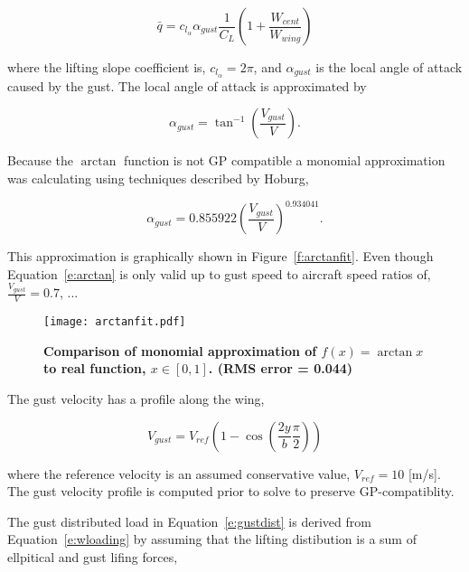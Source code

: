 \documentclass[]{aiaa-tc}%
\begin{document}
\begin{equation}
    \label{e:gustdist}
    \bar{q} = c_{l_{\alpha}} \alpha_{gust} \frac{1}{C_L} \left( 1 + \frac{W_{cent}}{W_{wing}} \right)
\end{equation}

where the lifting slope coefficient is, $c_{l_{\alpha}}=2\pi$, and $\alpha_{gust}$ is the local angle of attack caused by the gust. The local angle of attack is approximated by 

\begin{equation}
    \label{e:gustalpha}
    \alpha_{gust} = \tan^{-1}\left(\frac{V_{gust}}{V} \right).
\end{equation}

Because the $\arctan$ function is not GP compatible a monomial approximation was calculating using techniques described by Hoburg\cite{fitting},

\begin{equation}
    \label{e:arctan}
    \alpha_{gust} = 0.855922 \left(\frac{V_{gust}}{V} \right)^{0.934041}.
\end{equation}

This approximation is graphically shown in Figure~\ref{f:arctanfit}.  Even though Equation~\ref{e:arctan} is only valid up to gust speed to aircraft speed ratios of, $\frac{V_{gust}}{V} = 0.7$, ...

\begin{figure}[H]
	\begin{center}
	\texttt{[image: arctanfit.pdf]}
    \caption{ \textbf{ Comparison of monomial approximation of $f(x) = \arctan{x}$ to real function, $x \in [0,1]$. (RMS error = 0.044) }}
	\label{f:gustvschord}
	\end{center}
\end{figure}

The gust velocity has a profile along the wing\cite{acgust},

\begin{equation}
    \label{e:gustwind}
    V_{gust} = V_{ref} \left(1-\cos\left(\frac{2y}{b} \frac{\pi}{2} \right) \right)
\end{equation}

where the reference velocity is an assumed conservative value\cite{acgust}, $V_{ref} = 10$ [m/s]. The gust velocity profile is computed prior to solve to preserve GP-compatiblity. 

The gust distributed load in Equation~\ref{e:gustdist} is derived from Equation~\ref{e:wloading} by assuming that the lifting distibution is a sum of ellpitical and gust lifing forces,
\end{document}
